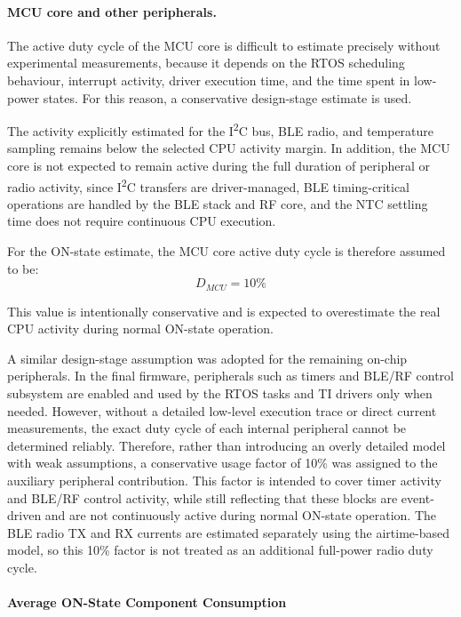 \paragraph{MCU core and other peripherals.}
\label{par:on_state_mcu_core_peripherals}
The active duty cycle of the MCU core is difficult to estimate precisely without experimental measurements, because it depends on the RTOS scheduling behaviour, interrupt activity, driver execution time, and the time spent in low-power states. 
For this reason, a conservative design-stage estimate is used.

The activity explicitly estimated for the I\textsuperscript{2}C bus, BLE radio, and temperature sampling remains below the selected CPU activity margin. 
In addition, the MCU core is not expected to remain active during the full duration of peripheral or radio activity, since I\textsuperscript{2}C transfers are driver-managed, BLE timing-critical operations are handled by the BLE stack and RF core, and the NTC settling time does not require continuous CPU execution.

For the ON-state estimate, the MCU core active duty cycle is therefore assumed to be:
\begin{equation}
	D_{MCU} = 10\%
\end{equation}

This value is intentionally conservative and is expected to overestimate the real CPU activity during normal ON-state operation.

A similar design-stage assumption was adopted for the remaining on-chip peripherals. In the final firmware, peripherals such as timers and BLE/RF control subsystem are enabled and used by the RTOS tasks and TI drivers only when needed. However, without a detailed low-level execution trace or direct current measurements, the exact duty cycle of each internal peripheral cannot be determined reliably. Therefore, rather than introducing an overly detailed model with weak assumptions, a conservative usage factor of 10\% was assigned to the auxiliary peripheral contribution. This factor is intended to cover timer activity and BLE/RF control activity, while still reflecting that these blocks are event-driven and are not continuously active during normal ON-state operation. The BLE radio TX and RX currents are estimated separately using the airtime-based model, so this 10\% factor is not treated as an additional full-power radio duty cycle.

\paragraph{Average ON-State Component Consumption}
\label{sec:on_state_component_consumption}


